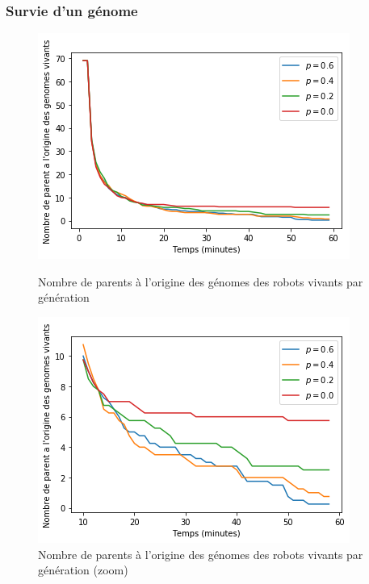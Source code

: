 \documentclass[a4paper]{article}
\begin{document}
\subsubsection{Survie d'un génome}
\begin{figure}[h]
	\begin{minipage}[c]{.46\linewidth}
		\centering
		\includegraphics[width=1.1\linewidth]{../../script_results/parent_origine_medea_full.png}
		\caption{Nombre de parents à l'origine des génomes des robots vivants par génération}
	\end{minipage}
	\hfill
	\begin{minipage}[c]{.46\linewidth}
		\centering
		\includegraphics[width=1.1\linewidth]{../../script_results/parent_origine_medea_zoom.png}
		\caption{Nombre de parents à l'origine des génomes des robots vivants par génération (zoom)}
	\end{minipage}
\end{figure}
\end{document}
